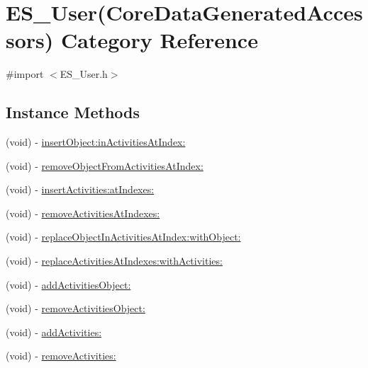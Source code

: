 \hypertarget{category_e_s___user_07_core_data_generated_accessors_08}{\section{E\+S\+\_\+\+User(Core\+Data\+Generated\+Accessors) Category Reference}
\label{category_e_s___user_07_core_data_generated_accessors_08}
}


{\ttfamily \#import $<$E\+S\+\_\+\+User.\+h$>$}

\subsection*{Instance Methods}
\begin{DoxyCompactItemize}
\item 
(void) -\/ \hyperlink{category_e_s___user_07_core_data_generated_accessors_08_ad5f49e8aaa1e143978b51a625c543745}{insert\+Object\+:in\+Activities\+At\+Index\+:}
\item 
(void) -\/ \hyperlink{category_e_s___user_07_core_data_generated_accessors_08_aed354c2e3a0546f04bec47b5a66043c5}{remove\+Object\+From\+Activities\+At\+Index\+:}
\item 
(void) -\/ \hyperlink{category_e_s___user_07_core_data_generated_accessors_08_a49fbde6aef1a5da3d99273be78809508}{insert\+Activities\+:at\+Indexes\+:}
\item 
(void) -\/ \hyperlink{category_e_s___user_07_core_data_generated_accessors_08_af822b76e969c607f6c1134cec7c3b98b}{remove\+Activities\+At\+Indexes\+:}
\item 
(void) -\/ \hyperlink{category_e_s___user_07_core_data_generated_accessors_08_a8fec20bc65f3da30179fd131814d3dc5}{replace\+Object\+In\+Activities\+At\+Index\+:with\+Object\+:}
\item 
(void) -\/ \hyperlink{category_e_s___user_07_core_data_generated_accessors_08_aac490ec84102d4a104ffdf54e1d52df5}{replace\+Activities\+At\+Indexes\+:with\+Activities\+:}
\item 
(void) -\/ \hyperlink{category_e_s___user_07_core_data_generated_accessors_08_a0b7cec517bac54cea0553a2fa35638c2}{add\+Activities\+Object\+:}
\item 
(void) -\/ \hyperlink{category_e_s___user_07_core_data_generated_accessors_08_abbe5c2dc945b27ec3af3c7bb9f211dc3}{remove\+Activities\+Object\+:}
\item 
(void) -\/ \hyperlink{category_e_s___user_07_core_data_generated_accessors_08_adf7e5867a32e7e5e3111667e4769466b}{add\+Activities\+:}
\item 
(void) -\/ \hyperlink{category_e_s___user_07_core_data_generated_accessors_08_aaec6290646915eff69b7bcfc84d7c522}{remove\+Activities\+:}
\end{DoxyCompactItemize}


